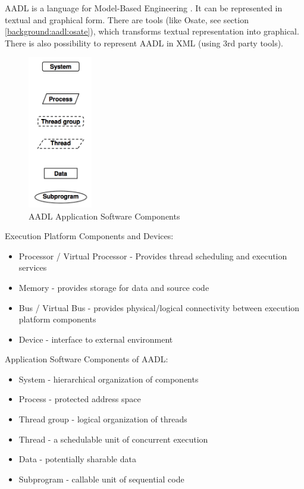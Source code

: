 AADL is a language for Model-Based Engineering \cite{AadlBook}. It can be represented in textual and graphical form. There are tools (like Osate, see section \ref{background:aadl:osate}), which transforms textual representation into graphical. There is also possibility to represent AADL in XML (using 3rd party tools). 

\begin{figure}
  \begin{center}
    \includegraphics[width=0.25\textwidth]{figures/aadl-app-components.png}
  \end{center}
  \caption{AADL Application Software Components}
  \label{figure:aadl_app_software_components}
\end{figure}

Execution Platform Components and Devices:
\begin{itemize}
	\item Processor / Virtual Processor - Provides thread scheduling and execution services
	\item Memory - provides storage for data and source code
	\item Bus / Virtual Bus - provides physical/logical connectivity between execution platform components
	\item Device - interface to external environment
\end{itemize}

Application Software Components of AADL:
\begin{itemize}
	\item System - hierarchical organization of components
	\item Process - protected address space
	\item Thread group - logical organization of threads
	\item Thread - a schedulable unit of concurrent execution
	\item Data - potentially sharable data
	\item Subprogram - callable unit of sequential code
\end{itemize}

